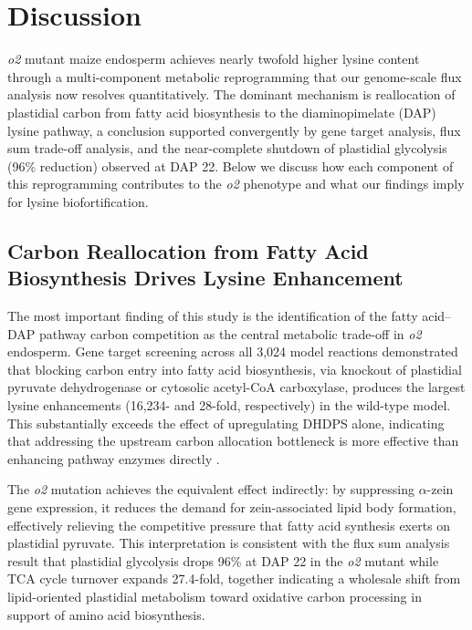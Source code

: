 \documentclass[12pt,a4paper]{article}
\begin{document}
\section{Discussion}

\textit{o2} mutant maize endosperm achieves nearly twofold higher lysine content through a multi-component metabolic reprogramming that our genome-scale flux analysis now resolves quantitatively. The dominant mechanism is reallocation of plastidial carbon from fatty acid biosynthesis to the diaminopimelate (DAP) lysine pathway, a conclusion supported convergently by gene target analysis, flux sum trade-off analysis, and the near-complete shutdown of plastidial glycolysis (96\% reduction) observed at DAP 22. Below we discuss how each component of this reprogramming contributes to the \textit{o2} phenotype and what our findings imply for lysine biofortification.

\subsection{Carbon Reallocation from Fatty Acid Biosynthesis Drives Lysine Enhancement}

The most important finding of this study is the identification of the fatty acid--DAP pathway carbon competition as the central metabolic trade-off in \textit{o2} endosperm. Gene target screening across all 3,024 model reactions demonstrated that blocking carbon entry into fatty acid biosynthesis, via knockout of plastidial pyruvate dehydrogenase or cytosolic acetyl-CoA carboxylase, produces the largest lysine enhancements (16,234- and 28-fold, respectively) in the wild-type model. This substantially exceeds the effect of upregulating DHDPS alone, indicating that addressing the upstream carbon allocation bottleneck is more effective than enhancing pathway enzymes directly \citep{Frizzi2008}.

The \textit{o2} mutation achieves the equivalent effect indirectly: by suppressing $\alpha$-zein gene expression, it reduces the demand for zein-associated lipid body formation, effectively relieving the competitive pressure that fatty acid synthesis exerts on plastidial pyruvate. This interpretation is consistent with the flux sum analysis result that plastidial glycolysis drops 96\% at DAP 22 in the \textit{o2} mutant while TCA cycle turnover expands 27.4-fold, together indicating a wholesale shift from lipid-oriented plastidial metabolism toward oxidative carbon processing in support of amino acid biosynthesis.
\end{document}
